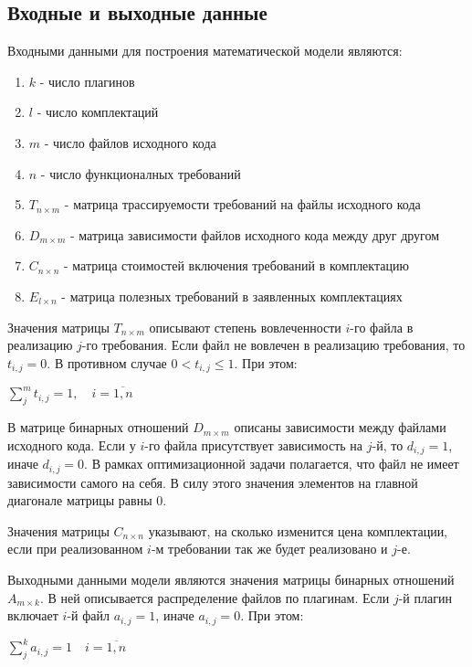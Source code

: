 \subsection*{Входные и выходные данные}
Входными данными для построения математической модели являются:
\begin{enumerate}
    \item $k$ - число плагинов
    \item $l$ - число комплектаций
    \item $m$ - число файлов исходного кода
    \item $n$ - число функционалных требований
    \item $T_{n \times m}$ - матрица трассируемости требований на файлы исходного кода
    \item $D_{m \times m}$ - матрица зависимости файлов исходного кода между друг другом
    \item $C_{n \times n}$ - матрица стоимостей включения требований в комплектацию
    \item $E_{l \times n}$ - матрица полезных требований в заявленных комплектациях
\end{enumerate}


Значения матрицы $T_{n \times m}$ описывают степень вовлеченности $i$-го файла в реализацию $j$-го требования. Если файл не вовлечен в реализацию требования, то $t_{i, j} = 0$. В противном случае $0 < t_{i, j} \le 1$. При этом:
\begin{center}
  $\displaystyle \sum^{m}_{j}t_{i, j} = 1, \quad i = \overline{1, n}$
\end{center}

В матрице бинарных отношений $D_{m \times m}$ описаны зависимости между файлами исходного кода. Если у $i$-го файла присутствует зависимость на $j$-й, то $d_{i, j} = 1$, иначе $d_{i, j} = 0$. В рамках оптимизационной задачи полагается, что файл не имеет зависимости самого на себя. В силу этого значения элементов на главной диагонале матрицы равны $0$.

Значения матрицы $C_{n \times n}$ указывают, на сколько изменится цена комплектации, если при реализованном $i$-м требовании так же будет реализовано и $j$-е.

Выходными данными модели являются значения матрицы бинарных отношений $A_{m \times k}$. В ней описывается распределение файлов по плагинам. Если $j$-й плагин включает $i$-й файл $a_{i, j} = 1$, иначе $a_{i, j} = 0$. При этом:
\begin{center}
    $\displaystyle \sum^{k}_{j} a_{i, j} = 1 \quad i = \overline{1, n}$
\end{center}

